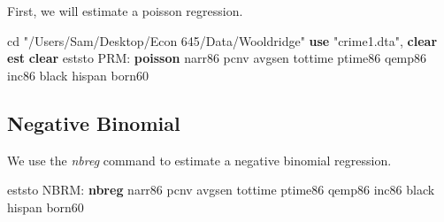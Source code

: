 \documentclass[
]{book}
\newenvironment{Shaded}{\begin{snugshade}}{\end{snugshade}}
\newcommand{\BaseNTok}[1]{\textcolor[rgb]{0.00,0.00,0.81}{#1}}
\newcommand{\KeywordTok}[1]{\textcolor[rgb]{0.13,0.29,0.53}{\textbf{#1}}}
\newcommand{\NormalTok}[1]{#1}
\newcommand{\StringTok}[1]{\textcolor[rgb]{0.31,0.60,0.02}{#1}}
\begin{document}
First, we will estimate a poisson regression.

\begin{Shaded}
\begin{Highlighting}[]
\NormalTok{cd }\StringTok{"/Users/Sam/Desktop/Econ 645/Data/Wooldridge"}
\KeywordTok{use} \StringTok{"crime1.dta"}\NormalTok{, }\KeywordTok{clear}
\KeywordTok{est} \KeywordTok{clear}
\NormalTok{eststo PRM: }\KeywordTok{poisson}\NormalTok{ narr86 pcnv avgsen tottime ptime86 qemp86 inc86 }\BaseNTok{black}\NormalTok{ hispan born60 }
\end{Highlighting}
\end{Shaded}

\subsection*{Negative Binomial}\label{negative-binomial}

We use the \emph{nbreg} command to estimate a negative binomial regression.

\begin{Shaded}
\begin{Highlighting}[]
\NormalTok{eststo NBRM: }\KeywordTok{nbreg}\NormalTok{ narr86 pcnv avgsen tottime ptime86 qemp86 inc86 }\BaseNTok{black}\NormalTok{ hispan born60 }
\end{Highlighting}
\end{Shaded}
\end{document}
